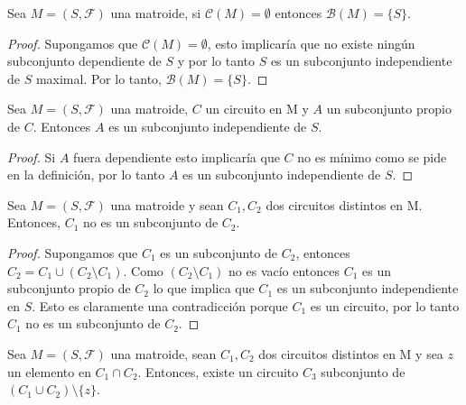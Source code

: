 \begin{cor}
Sea $M=(S,\mathcal{F})$ una matroide, si $\mathcal{C}(M)=\emptyset$ entonces $\mathcal{B}(M)=\{S\}$.
\end{cor}

\begin{proof}
Supongamos que $\mathcal{C}(M)=\emptyset$, esto implicaría que no existe ningún subconjunto dependiente de $S$ y por lo tanto $S$ es un subconjunto independiente de $S$ maximal. Por lo tanto, $\mathcal{B}(M)=\{S\}$.
\end{proof}

\begin{cor}
Sea $M=(S,\mathcal{F})$ una matroide, $C$ un circuito en M y $A$ un subconjunto propio de $C$. Entonces $A$ es un subconjunto independiente de $S$.
\end{cor}

\begin{proof}
Si $A$ fuera dependiente esto implicaría que $C$ no es mínimo como se pide en la definición, por lo tanto $A$ es un subconjunto independiente de $S$.
\end{proof}

\begin{cor} \label{C1}
Sea $M=(S,\mathcal{F})$ una matroide y sean $C_1, C_2$ dos circuitos distintos en M. Entonces, $C_1$ no es un subconjunto de $C_2$. 
\end{cor}

\begin{proof}
Supongamos que $C_1$ es un subconjunto de $C_2$, entonces $C_2=C_1 \cup (C_2 \setminus C_1)$. Como $(C_2 \setminus C_1)$ no es vacío entonces $C_1$ es un subconjunto propio de $C_2$ lo que implica que $C_1$ es un subconjunto independiente en $S$. Esto es claramente una contradicción porque $C_1$ es un circuito, por lo tanto $C_1$ no es un subconjunto de $C_2$.
\end{proof}

\begin{cor} \label{C2}
Sea $M=(S,\mathcal{F})$ una matroide, sean $C_1, C_2$ dos circuitos distintos en M y sea $z$ un elemento en $C_1 \cap C_2$. Entonces, existe un circuito $C_3$ subconjunto de $(C_1 \cup C_2)\setminus \{z\}$.
\end{cor}

